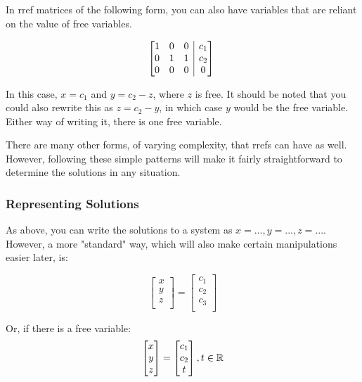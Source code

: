 \documentclass[12pt]{article}
\begin{document}
\begin{itemize}
    In rref matrices of the following form, you can also have variables that are reliant on the value of free variables. 
     
     $$
    \begin{array}[t][{@{}ccc|c@{}}]
     1 & 0 & 0 & c_1 \\
     0 & 1 & 1 & c_2 \\
     0 & 0 & 0 & 0 \\
    \end{array}\
    $$
    
    In this case, $x = c_1$ and $y = c_2 - z$, where $z$ is free. It should be noted that you could also rewrite this as $z = c_2 - y$, in which case $y$ would be the free variable. Either way of writing it, there is one free variable.
\end{itemize}

There are many other forms, of varying complexity, that rrefs can have as well. However, following these simple patterns will make it fairly straightforward to determine the solutions in any situation.

\subsubsection{Representing Solutions}

As above, you can write the solutions to a system as $x = ..., y = ..., z = ...$. However, a more "standard" way, which will also make certain manipulations easier later, is:

\[
    \begin{bmatrix}
     x \\
     y \\
     z \\
    \end{bmatrix} 
    = 
    \begin{bmatrix}
     c_1 \\
     c_2 \\
     c_3 \\
    \end{bmatrix}
\]

Or, if there is a free variable: 
\[
    \begin{bmatrix}
    x \\
    y \\ 
    z \\
    \end{bmatrix}
    = 
    \begin{bmatrix}
    c_1 \\
    c_2 \\
    t \\
    \end{bmatrix}
    , t \in \mathbb{R}
\]
\end{document}
